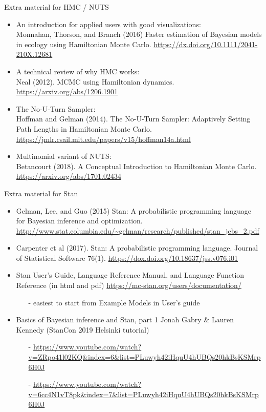 \documentclass[finnish,english,t]{beamer}
\begin{document}
\begin{frame}{Extra material for HMC / NUTS}

  \begin{itemize}
  \item An introduction for applied users with good visualizations:\\
    Monnahan, Thorson, and Branch (2016)
    Faster estimation of Bayesian models in ecology using Hamiltonian
    Monte Carlo. \url{https://dx.doi.org/10.1111/2041-210X.12681}
  \item A technical review of why HMC works:\\
    Neal (2012). MCMC using Hamiltonian
    dynamics. \url{https://arxiv.org/abs/1206.1901}
  \item The No-U-Turn Sampler:\\
    Hoffman and Gelman (2014). The No-U-Turn
    Sampler: Adaptively Setting Path Lengths in Hamiltonian Monte
    Carlo. \url{https://jmlr.csail.mit.edu/papers/v15/hoffman14a.html}
  \item Multinomial variant of NUTS:\\
    Betancourt (2018).  A Conceptual Introduction to
    Hamiltonian Monte Carlo. \url{https://arxiv.org/abs/1701.02434}
  \end{itemize}

\end{frame}


\begin{frame}{Extra material for Stan}

  \begin{itemize}
  \item Gelman, Lee, and Guo (2015) Stan: A
    probabilistic programming language for Bayesian inference and
    optimization. \url{http://www.stat.columbia.edu/~gelman/research/published/stan_jebs_2.pdf}
  \item Carpenter et al (2017). Stan: A probabilistic programming
    language. Journal of Statistical Software
    76(1). \url{https://dox.doi.org/10.18637/jss.v076.i01}
  \item Stan User's Guide, Language Reference Manual, and Language
    Function Reference (in html and pdf)
    \url{https://mc-stan.org/users/documentation/}
    \begin{itemize}
    \item[-] easiest to start from Example Models in User's guide
    \end{itemize}
  \item Basics of Bayesian inference and Stan, part 1 Jonah Gabry \&
    Lauren Kennedy (StanCon 2019 Helsinki tutorial)
    \begin{itemize}
    \item[-]
      \url{https://www.youtube.com/watch?v=ZRpo41l02KQ&index=6&list=PLuwyh42iHquU4hUBQs20hkBsKSMrp6H0J}
    \item[-] \url{https://www.youtube.com/watch?v=6cc4N1vT8pk&index=7&list=PLuwyh42iHquU4hUBQs20hkBsKSMrp6H0J}
  \end{itemize}
  \end{itemize}
\end{frame}
\end{document}
